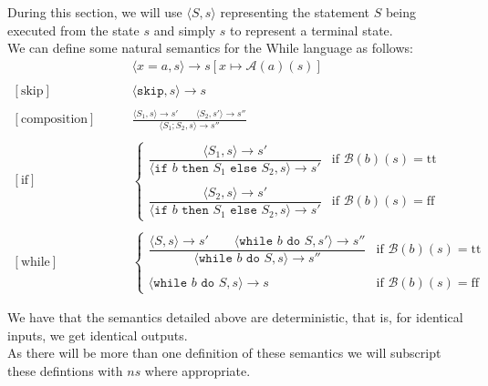 \documentclass[a4paper, 12pt, twoside]{article}
\begin{document}
During this section, we will use $\langle S, s\rangle$
representing the statement $S$ being executed from the state $s$ and
simply $s$ to represent a terminal state.
\\[\baselineskip]
We can define some natural semantics for the While language as follows:
\begin{align*}
  [\text{assignment}]& \qquad \langle x=a, s \rangle \to s[x\mapsto \mathcal{A}(a)(s)] \\ \\
  [\text{skip}]& \qquad \langle \texttt{skip}, s \rangle \to s \\ \\
  [\text{composition}]& \qquad \frac{
    \langle S_1, s \rangle \to s' \qquad \langle S_2, s' \rangle \to s''
  }{\langle S_1;S_2, s \rangle \to s''} \\ \\
  [\text{if}]& \qquad \begin{cases}
    \dfrac{
      \langle S_1, s \rangle \to s'
    }{
      \langle \texttt{if } b \texttt{ then } S_1 \texttt{ else } S_2, s \rangle \to s'
    } & \text{if } \mathcal{B}(b)(s) = \text{tt} \\ \\
    \dfrac{
      \langle S_2, s \rangle \to s'
    }{
      \langle \texttt{if } b \texttt{ then } S_1 \texttt{ else } S_2, s \rangle \to s'
    } & \text{if } \mathcal{B}(b)(s) = \text{ff}
  \end{cases} \\ \\
  [\text{while}]& \qquad \begin{cases}
    \dfrac{
      \langle S, s \rangle \to s' \qquad \langle 
      \texttt{while } b \texttt{ do } S, s' \rangle \to s''
    }{
      \langle \texttt{while } b \texttt{ do } S, s \rangle \to s''
    } & \text{if } \mathcal{B}(b)(s) = \text{tt} \\ \\
    \langle \texttt{while } b \texttt{ do } S, s \rangle \to s
    & \text{if } \mathcal{B}(b)(s) = \text{ff}
  \end{cases}
\end{align*}

We have that the semantics detailed above are deterministic, that is,
for identical inputs, we get identical outputs.
\\[\baselineskip]
As there will be more than one definition of these semantics
we will subscript these defintions with $ns$ where appropriate.
\end{document}

